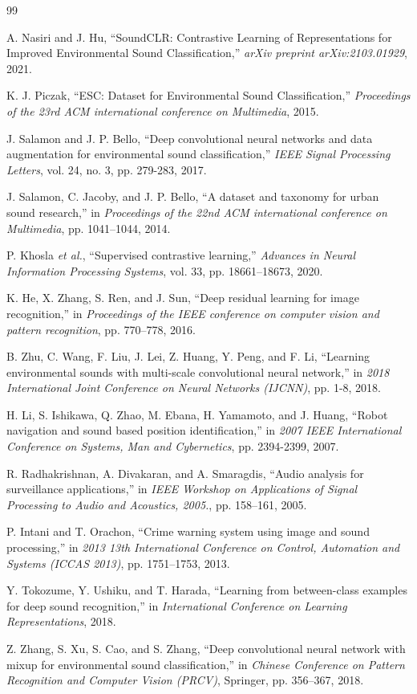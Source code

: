 \documentclass[twocolumn, 10pt]{article}
\begin{document}
\clearpage
\begin{thebibliography}{99}

A. Nasiri and J. Hu, ``SoundCLR: Contrastive Learning of Representations for Improved Environmental Sound Classification,'' \textit{arXiv preprint arXiv:2103.01929}, 2021.

K. J. Piczak, ``ESC: Dataset for Environmental Sound Classification,'' \textit{Proceedings of the 23rd ACM international conference on Multimedia}, 2015.

J. Salamon and J. P. Bello, ``Deep convolutional neural networks and data augmentation for environmental sound classification,'' \textit{IEEE Signal Processing Letters}, vol. 24, no. 3, pp. 279-283, 2017.

J. Salamon, C. Jacoby, and J. P. Bello, ``A dataset and taxonomy for urban sound research,'' in \textit{Proceedings of the 22nd ACM international conference on Multimedia}, pp. 1041--1044, 2014.

P. Khosla \textit{et al.}, ``Supervised contrastive learning,'' \textit{Advances in Neural Information Processing Systems}, vol. 33, pp. 18661--18673, 2020.

K. He, X. Zhang, S. Ren, and J. Sun, ``Deep residual learning for image recognition,'' in \textit{Proceedings of the IEEE conference on computer vision and pattern recognition}, pp. 770--778, 2016.

B. Zhu, C. Wang, F. Liu, J. Lei, Z. Huang, Y. Peng, and F. Li, ``Learning environmental sounds with multi-scale convolutional neural network,'' in \textit{2018 International Joint Conference on Neural Networks (IJCNN)}, pp. 1-8, 2018.

H. Li, S. Ishikawa, Q. Zhao, M. Ebana, H. Yamamoto, and J. Huang, ``Robot navigation and sound based position identification,'' in \textit{2007 IEEE International Conference on Systems, Man and Cybernetics}, pp. 2394-2399, 2007.

R. Radhakrishnan, A. Divakaran, and A. Smaragdis, ``Audio analysis for surveillance applications,'' in \textit{IEEE Workshop on Applications of Signal Processing to Audio and Acoustics, 2005.}, pp. 158--161, 2005.

P. Intani and T. Orachon, ``Crime warning system using image and sound processing,'' in \textit{2013 13th International Conference on Control, Automation and Systems (ICCAS 2013)}, pp. 1751--1753, 2013.

Y. Tokozume, Y. Ushiku, and T. Harada, ``Learning from between-class examples for deep sound recognition,'' in \textit{International Conference on Learning Representations}, 2018.

Z. Zhang, S. Xu, S. Cao, and S. Zhang, ``Deep convolutional neural network with mixup for environmental sound classification,'' in \textit{Chinese Conference on Pattern Recognition and Computer Vision (PRCV)}, Springer, pp. 356--367, 2018.

\end{thebibliography}
\end{document}
